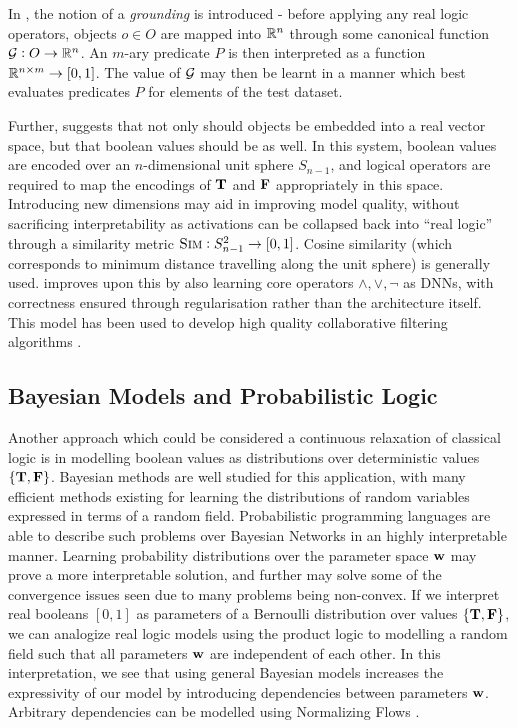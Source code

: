 In \cite{ltn2016}, the notion of a \textit{grounding} is introduced - before applying any real logic operators, objects $o \in O$ are mapped into $\mathbb{R}^n$ through some canonical function $\mathcal{G} : O \to \mathbb{R}^n$. An $m$-ary predicate $P$ is then interpreted as a function $\mathbb{R}^{n\times m} \to [0,1]$. The value of $\mathcal{G}$ may then be learnt in a manner which best evaluates predicates $P$ for elements of the test dataset. 

Further, \cite{embeddedgoogle} suggests that not only should objects be embedded into a real vector space, but that boolean values should be as well. In this system, boolean values are encoded over an $n$-dimensional unit sphere $S_{n-1}$, and logical operators are required to map the encodings of $\textbf{T}$ and $\textbf{F}$ appropriately in this space. Introducing new dimensions may aid in improving model quality, without sacrificing interpretability as activations can be collapsed back into ``real logic'' through a similarity metric $\textsc{Sim}:S_{n-1}^2 \to [0,1]$. Cosine similarity (which corresponds to minimum distance travelling along the unit sphere) is generally used. \cite{embeddedlogicreg} improves upon this by also learning core operators $\land, \lor, \lnot$ as DNNs, with correctness ensured through regularisation rather than the architecture itself. This model has been used to develop high quality collaborative filtering algorithms \cite{embeddedcollabreasoning}.

\subsection{Bayesian Models and Probabilistic Logic}

Another approach which could be considered a continuous relaxation of classical logic is in modelling boolean values as distributions over deterministic values $\{\textbf{T}, \textbf{F}\}$. Bayesian methods are well studied for this application, with many efficient methods existing for learning the distributions of random variables expressed in terms of a random field. Probabilistic programming languages \cite{gordon2014probabilistic} are able to describe such problems over Bayesian Networks in an highly interpretable manner. Learning probability distributions over the parameter space $\mathbf{w}$ may prove a more interpretable solution, and further may solve some of the convergence issues seen due to many problems being non-convex. If we interpret real booleans $[0,1]$ as parameters of a Bernoulli distribution over values $\{\textbf{T}, \textbf{F}\}$, we can analogize real logic models using the product logic to modelling a random field such that all parameters $\mathbf{w}$ are independent of each other. In this interpretation, we see that using general Bayesian models increases the expressivity of our model by introducing dependencies between parameters $\mathbf{w}$. Arbitrary dependencies can be modelled using Normalizing Flows \cite{normalizingflows}.

